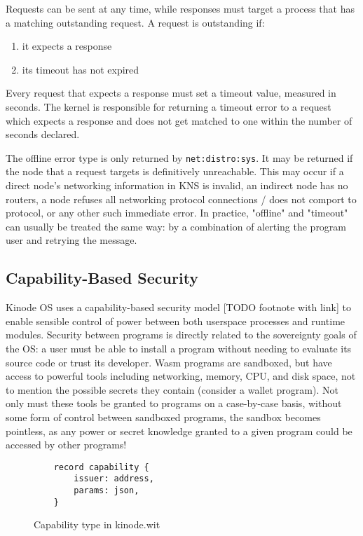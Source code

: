 \documentclass[runningheads]{llncs}
\begin{document}
Requests can be sent at any time, while responses must target a process that has a matching outstanding request.
A request is outstanding if:
\begin{enumerate}
    \item it expects a response
    \item its timeout has not expired
\end{enumerate}
Every request that expects a response must set a timeout value, measured in seconds.
The kernel is responsible for returning a timeout error to a request which expects a response and does not get matched to one within the number of seconds declared.

The offline error type is only returned by \verb|net:distro:sys|.
It may be returned if the node that a request targets is definitively unreachable.
This may occur if a direct node's networking information in KNS is invalid, an indirect node has no routers, a node refuses all networking protocol connections / does not comport to protocol, or any other such immediate error.
In practice, "offline" and "timeout" can usually be treated the same way: by a combination of alerting the program user and retrying the message.

\subsection{Capability-Based Security}

Kinode OS uses a capability-based security model [TODO footnote with link] to enable sensible control of power between both userspace processes and runtime modules.
Security between programs is directly related to the sovereignty goals of the OS: a user must be able to install a program without needing to evaluate its source code or trust its developer.
Wasm programs are sandboxed, but have access to powerful tools including networking, memory, CPU, and disk space, not to mention the possible secrets they contain (consider a wallet program).
Not only must these tools be granted to programs on a case-by-case basis, without some form of control between sandboxed programs, the sandbox becomes pointless, as any power or secret knowledge granted to a given program could be accessed by other programs!

\begin{figure}
    \centering
    \begin{lstlisting}
    record capability {
        issuer: address,
        params: json,
    }
    \end{lstlisting}
    \caption{Capability type in kinode.wit}
    \label{fig:WIT Types 3}
\end{figure}
\end{document}
